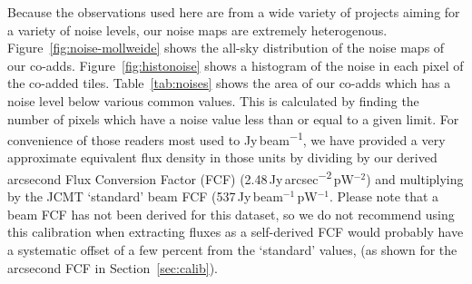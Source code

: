 \documentclass[twocolumn,times]{aastex6}
\newcommand{\jyas}{Jy\,arcsec\textsuperscript{$-$2}}
\begin{document}
Because the observations used here are from a wide variety of projects
aiming for a variety of noise levels, our noise maps are extremely
heterogenous. Figure~\ref{fig:noise-mollweide} shows the all-sky
distribution of the noise maps of our
co-adds. Figure~\ref{fig:histonoise} shows a histogram of the noise in
each pixel of the co-added tiles. Table~\ref{tab:noises} shows the area
of our co-adds which has a noise level below various common
values. This is calculated by finding the number of pixels which have
a noise value less than or equal to a given limit. For convenience of
those readers most used to Jy\,beam\textsuperscript{$-1$}, we have
provided a very approximate equivalent flux density in those units by
dividing by our derived arcsecond Flux Conversion Factor (FCF)
(2.48\,\jyas\,pW$^{-2}$) and multiplying by the JCMT `standard' beam FCF
(537\,Jy\,beam$^{-1}$\,pW$^{-1}$. Please note that a beam FCF has not been
derived for this dataset, so we do not recommend using this
calibration when extracting fluxes as a self-derived FCF would
probably have a systematic offset of a few percent from the `standard'
values, (as shown for the arcsecond FCF in Section~\ref{sec:calib}).
\end{document}
